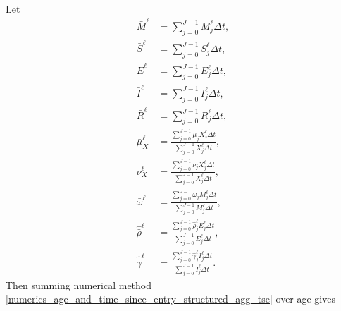 \documentclass[USenglish]{article}
\begin{document}
Let
\begin{subequations}
  \begin{align}
    \bar{M}^{\ell} &= \sum_{j = 0}^{J - 1} M_j^{\ell} \Delta t,
    \\
    \bar{S}^{\ell} &= \sum_{j = 0}^{J - 1} S_j^{\ell} \Delta t,
    \\
    \bar{E}^{\ell} &= \sum_{j = 0}^{J - 1} E_j^{\ell} \Delta t,
    \\
    \bar{I}^{\ell} &= \sum_{j = 0}^{J - 1} I_j^{\ell} \Delta t,
    \\
    \bar{R}^{\ell} &= \sum_{j = 0}^{J - 1} R_j^{\ell} \Delta t,
    \\
    \bar{\mu}_X^{\ell}
    &= \frac{\sum_{j = 0}^{J - 1} \mu_j X_j^{\ell} \Delta t}
    {\sum_{j = 0}^{J - 1} X_j^{\ell} \Delta t},
    \\
    \bar{\nu}_X^{\ell}
    &= \frac{\sum_{j = 0}^{J - 1} \nu_j X_j^{\ell} \Delta t}
    {\sum_{j = 0}^{J - 1} X_j^{\ell} \Delta t},
    \\
    \bar{\omega}^{\ell}
    &= \frac{\sum_{j = 0}^{J - 1} \omega_j M_j^{\ell} \Delta t}
    {\sum_{j = 0}^{J - 1} M_j^{\ell} \Delta t},
    \\
    \hat{\bar{\rho}}^{\ell}
    &= \frac{\sum_{j = 0}^{J - 1} \hat{\rho}_j^{\ell} E_j^{\ell} \Delta t}
    {\sum_{j = 0}^{J - 1} E_j^{\ell} \Delta t},
    \\
    \hat{\bar{\gamma}}^{\ell}
    &= \frac{\sum_{j = 0}^{J - 1} \hat{\gamma}_j^{\ell} I_j^{\ell} \Delta t}
    {\sum_{j = 0}^{J - 1} I_j^{\ell} \Delta t}.
  \end{align}
\end{subequations}
Then summing numerical method
\eqref{numerics_age_and_time_since_entry_structured_agg_tse} over
age gives
\end{document}
